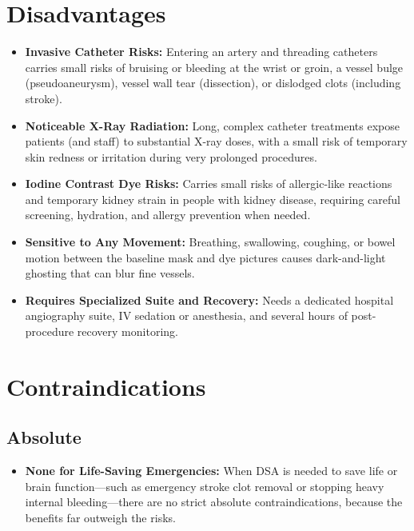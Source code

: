 \section{Disadvantages}
\begin{itemize}
\item \textbf{Invasive Catheter Risks:} Entering an artery and threading catheters carries small risks of bruising or bleeding at the wrist or groin, a vessel bulge (pseudoaneurysm), vessel wall tear (dissection), or dislodged clots (including stroke).
\item \textbf{Noticeable X-Ray Radiation:} Long, complex catheter treatments expose patients (and staff) to substantial X-ray doses, with a small risk of temporary skin redness or irritation during very prolonged procedures.
\item \textbf{Iodine Contrast Dye Risks:} Carries small risks of allergic-like reactions and temporary kidney strain in people with kidney disease, requiring careful screening, hydration, and allergy prevention when needed.
\item \textbf{Sensitive to Any Movement:} Breathing, swallowing, coughing, or bowel motion between the baseline mask and dye pictures causes dark-and-light ghosting that can blur fine vessels.
\item \textbf{Requires Specialized Suite and Recovery:} Needs a dedicated hospital angiography suite, IV sedation or anesthesia, and several hours of post-procedure recovery monitoring.
\end{itemize}

\section{Contraindications}

\subsection{Absolute}
\begin{itemize}
\item \textbf{None for Life-Saving Emergencies:} When DSA is needed to save life or brain function---such as emergency stroke clot removal or stopping heavy internal bleeding---there are no strict absolute contraindications, because the benefits far outweigh the risks.
\end{itemize}

